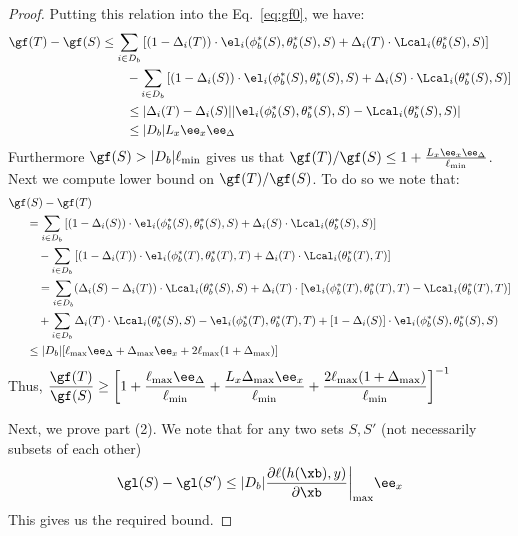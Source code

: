 \begin{proof}
Putting this relation into the Eq.~\eqref{eq:gf0}, we have:
  \begin{align}
   \gf(T) - \gf(S) & \le    \sum_{i\in D_b}\left[(1-\Delta_i(T)) \cdot \el_i(\phi_b ^*(S) , \theta_b ^*(S), S) + \Delta_i(T) \cdot \Lcal_i (\theta _b ^*(S), S) \right] \nonumber \\
& \qquad  - \sum_{i\in D_b} \left[(1-\Delta_i(S)) \cdot \el_i(\phi_b ^*(S) , \theta_b ^*(S), S) + \Delta_i(S) \cdot \Lcal_i (\theta _b ^*(S), S) \right] \\
& \qquad \le |\Delta_i(T) - \Delta_i(S)| |\el_i(\phi_b ^*(S) , \theta_b ^*(S), S) - \Lcal_i(\theta_b ^*(S), S) |\\
& \qquad \le |D_b| L_{x}\ee_x \ee_\Delta 
\end{align}
Furthermore $\gf(S) > |D_b|\ell_{\min}$ gives us that $\gf(T)/\gf(S) \le 1+\frac{L_x \ee_x \ee_\Delta }{\ell_{\min}}  $. Next we compute lower bound on $\gf(T)/\gf(S)$. To do so we note that:
\begin{align}
    \gf&(S) - \gf(T)\nonumber\\
    & = \sum_{i\in D_b}\left[(1-\Delta_i(S)) \cdot \el_i(\phi_b ^*(S) , \theta_b ^*(S), S) + \Delta_i(S) \cdot \Lcal_i (\theta _b ^*(S), S) \right]\nonumber \\
 &   \quad - \sum_{i\in D_b} \left[(1-\Delta_i(T)) \cdot \el_i(\phi_b ^*(T) , \theta_b ^*(T), T) + \Delta_i(T) \cdot \Lcal_i (\theta _b ^*(T), T) \right] \nonumber\\
 & \quad = \sum_{i\in D_b}(\Delta_i(S) -\Delta_i(T))\cdot \Lcal_i (\theta _b ^*(S), S) + \Delta_i(T)\cdot [ \el_i(\phi_b ^*(T) , \theta_b ^*(T), T)  - \Lcal_i( \theta_b ^*(T), T)] \nonumber \\
 &  \quad  + \sum_{i\in D_b} \Delta_i (T) \cdot \Lcal_i (\theta _b ^*(S), S) -\el_i(\phi_b ^*(T) , \theta_b ^*(T), T) +[1-\Delta_i(S)] \cdot \el_i(\phi_b ^*(S) , \theta_b ^*(S), S) \nonumber \\
 & \le |D_b|[ \ell_{\max} \ee_\Delta + \Delta_{\max} \ee_x + 2\ell_{\max} (1+\Delta_{\max})]
 \end{align}
 Thus, $\displaystyle  \frac{\gf(T)}{\gf(S)} \ge
 \left[1+   \frac{\ell_{\max} \ee_{\Delta}}{\ell_{\min}} 
  + \frac{L_x \Delta_{\max} \ee_x}{\ell_{\min}} + \frac{2\ell_{\max} (1+\Delta_{\max})}{\ell_{\min}}\right]^{-1}$
  
  Next, we prove part (2). We note that for any two sets $S,S'$ (not necessarily subsets of each other) 
\begin{align}
\gl(S)-\gl(S') \le  |D_b| \frac{\partial \ell(h(\xb),y)}{\partial \xb} \bigg|_{\max} \ee_x
 \end{align}
 This gives us the required bound.
\end{proof}
